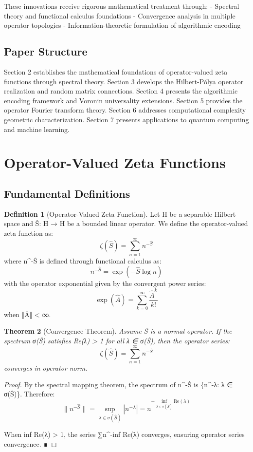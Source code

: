 \documentclass[12pt]{article}
\theoremstyle{plain}
\newtheorem{theorem}{Theorem}[section]
\theoremstyle{definition}
\newtheorem{definition}[theorem]{Definition}
\begin{document}
These innovations receive rigorous mathematical treatment through:
- Spectral theory and functional calculus foundations
- Convergence analysis in multiple operator topologies
- Information-theoretic formulation of algorithmic encoding

\subsection{Paper Structure}

Section 2 establishes the mathematical foundations of operator-valued zeta functions through spectral theory. Section 3 develops the Hilbert-Pólya operator realization and random matrix connections. Section 4 presents the algorithmic encoding framework and Voronin universality extensions. Section 5 provides the operator Fourier transform theory. Section 6 addresses computational complexity geometric characterization. Section 7 presents applications to quantum computing and machine learning.

\section{Operator-Valued Zeta Functions}

\subsection{Fundamental Definitions}

\begin{definition}[Operator-Valued Zeta Function]
Let H be a separable Hilbert space and Ŝ: H → H be a bounded linear operator. We define the operator-valued zeta function as:
$$\zeta(\hat{S}) = \sum_{n=1}^{\infty} n^{-\hat{S}}$$
where n^{-Ŝ} is defined through functional calculus as:
$$n^{-\hat{S}} = \exp(-\hat{S} \log n)$$
with the operator exponential given by the convergent power series:
$$\exp(\hat{A}) = \sum_{k=0}^{\infty} \frac{\hat{A}^k}{k!}$$
when ‖Â‖ < ∞.
\end{definition}

\begin{theorem}[Convergence Theorem]
Assume Ŝ is a normal operator. If the spectrum σ(Ŝ) satisfies Re(λ) > 1 for all λ ∈ σ(Ŝ), then the operator series:
$$\zeta(\hat{S}) = \sum_{n=1}^{\infty} n^{-\hat{S}}$$
converges in operator norm.
\end{theorem}

\begin{proof}
By the spectral mapping theorem, the spectrum of n^{-Ŝ} is \{n^{-λ}: λ ∈ σ(Ŝ)\}. Therefore:
$$\|n^{-\hat{S}}\| = \sup_{\lambda \in \sigma(\hat{S})} |n^{-\lambda}| = n^{-\inf_{\lambda \in \sigma(\hat{S})} \text{Re}(\lambda)}$$

When inf Re(λ) > 1, the series ∑n^{-inf Re(λ)} converges, ensuring operator series convergence. ∎
\end{proof}
\end{document}
